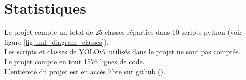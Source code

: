 \section{Statistiques}
Le projet compte un total de 25 classes réparties dans 10 scripts python (voir figure \ref{fig:uml_diagram_classes}).\\
Les scripts et classes de YOLOv7\cite{wang_yolov7_nodate} utilisés dans le projet ne sont pas comptés.\\
Le projet compte en tout 1576 lignes de code.\\
L'entièreté du projet est en accès libre sur github (\cite{pp2pf}).

\clearpage